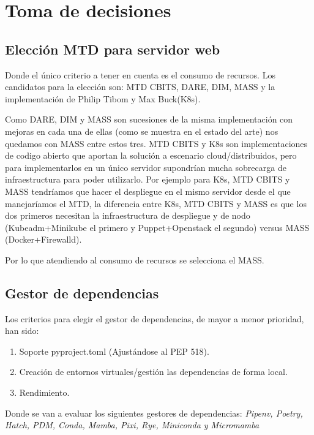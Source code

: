 \section{Toma de decisiones}

\subsection{Elección MTD para servidor web}
Donde el único criterio a tener en cuenta es el consumo de recursos.
Los candidatos para la elección son: MTD CBITS, DARE, DIM, MASS y la implementación de Philip Tibom y Max Buck\cite{MTD-gotemburgo}(K8s).

Como DARE, DIM y MASS son sucesiones de la misma implementación con mejoras en cada una de ellas (como se muestra en el estado del arte) nos quedamos con MASS entre estos tres.
MTD CBITS y K8s son implementaciones de codigo abierto que aportan la solución a escenario cloud/distribuidos, pero para implementarlos en un único servidor supondrían mucha sobrecarga de infraestructura para poder utilizarlo. Por ejemplo para K8s, MTD CBITS y MASS tendríamos que hacer el despliegue en el mismo servidor desde el que manejaríamos el MTD, la diferencia entre K8s, MTD CBITS y MASS es que los dos primeros necesitan la infraestructura de despliegue y de nodo (Kubeadm+Minikube el primero y Puppet+Openstack el segundo) versus MASS (Docker+Firewalld). 

Por lo que atendiendo al consumo de recursos se selecciona el MASS.

\subsection{Gestor de dependencias}
Los criterios para elegir el gestor de dependencias, de mayor a menor prioridad, han sido:
\begin{enumerate}
    \item Soporte pyproject.toml (Ajustándose al PEP 518\cite{pep-pyproject}).
    \item Creación de entornos virtuales/gestión las dependencias de forma local.
    \item Rendimiento.
\end{enumerate}

Donde se van a evaluar los siguientes gestores de dependencias: \textit{Pipenv, Poetry, Hatch, PDM, Conda, Mamba, Pixi, Rye, Miniconda y Micromamba}

